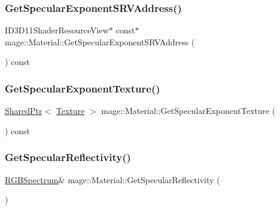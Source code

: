 \subsubsection{\texorpdfstring{Get\+Specular\+Exponent\+S\+R\+V\+Address()}{GetSpecularExponentSRVAddress()}}
{\footnotesize\ttfamily I\+D3\+D11\+Shader\+Resource\+View$\ast$ const$\ast$ mage\+::\+Material\+::\+Get\+Specular\+Exponent\+S\+R\+V\+Address (\begin{DoxyParamCaption}{ }\end{DoxyParamCaption}) const\hspace{0.3cm}{\ttfamily [noexcept]}}

\hypertarget{structmage_1_1_material_a24c476c257c3ba042ddda666c26660c0}{}\label{structmage_1_1_material_a24c476c257c3ba042ddda666c26660c0} 
\subsubsection{\texorpdfstring{Get\+Specular\+Exponent\+Texture()}{GetSpecularExponentTexture()}}
{\footnotesize\ttfamily \hyperlink{namespacemage_a1e01ae66713838a7a67d30e44c67703e}{Shared\+Ptr}$<$ \hyperlink{classmage_1_1_texture}{Texture} $>$ mage\+::\+Material\+::\+Get\+Specular\+Exponent\+Texture (\begin{DoxyParamCaption}{ }\end{DoxyParamCaption}) const\hspace{0.3cm}{\ttfamily [noexcept]}}

\hypertarget{structmage_1_1_material_ad5fde8d972471fc99b72a4fc969883b1}{}\label{structmage_1_1_material_ad5fde8d972471fc99b72a4fc969883b1} 
\subsubsection{\texorpdfstring{Get\+Specular\+Reflectivity()}{GetSpecularReflectivity()}\hspace{0.1cm}{\footnotesize\ttfamily [1/2]}}
{\footnotesize\ttfamily \hyperlink{structmage_1_1_r_g_b_spectrum}{R\+G\+B\+Spectrum}\& mage\+::\+Material\+::\+Get\+Specular\+Reflectivity (\begin{DoxyParamCaption}{ }\end{DoxyParamCaption})\hspace{0.3cm}{\ttfamily [noexcept]}}


